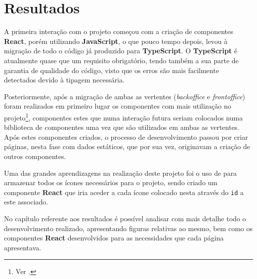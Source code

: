 \section{Resultados}

A primeira interação com o projeto começou com a criação de componentes \textbf{React}, porém utilizando \textbf{JavaScript}, o que pouco tempo depois, levou à migração de todo o código já produzido para \textbf{TypeScript}. O \textbf{TypeScript} é atualmente quase que um requisito obrigatório, tendo também a sua parte de garantia de qualidade do código, visto que os erros são mais facilmente detectados devido à tipagem necessária.

Posteriormente, após a migração de ambas as vertentes (\textit{backoffice} e \textit{frontoffice}) foram realizados em primeiro lugar os componentes com mais utilização no projeto\footnote{Ver .}, componentes estes que numa interação futura seriam colocados numa biblioteca de componentes uma vez que são utilizados em ambas as vertentes. Após estes componentes criados, o processo de desenvolvimento passou por criar páginas, nesta fase com dados estáticos, que por sua vez, originavam a criação de outros componentes.

Uma das grandes aprendizagens na realização deste projeto foi o uso de  \textbf{} para armazenar todos os ícones necessários para o projeto, sendo criado um componente \textbf{React} que iria aceder a cada ícone colocado nesta  através do \texttt{id} a este associado.

No capítulo referente aos resultados é possível analisar com mais detalhe todo o desenvolvimento realizado, apresentando figuras relativas ao mesmo, bem como os componentes \textbf{React} desenvolvidos para as necessidades que cada página apresentava.
